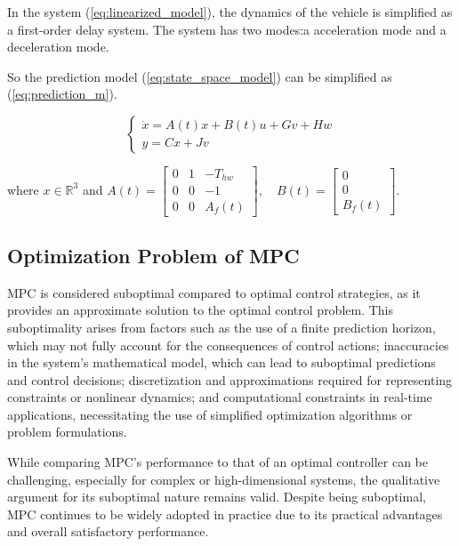 \documentclass{article}
\numberwithin{equation}{section}
\begin{document}
In the system (\ref{eq:linearized_model}), the dynamics of the vehicle is
simplified as a first-order delay system. The system has two modes:a
acceleration mode and a deceleration mode.

So the prediction model (\ref{eq:state_space_model}) can be simplified as
(\ref{eq:prediction_m}).

\begin{equation}
    \left\{\begin{array}{l}\label{eq:prediction_m}
        \dot{x}=A(t)x+B(t)u+Gv+Hw \\
        y=Cx+Jv
    \end{array}\right.
\end{equation}

\noindent where $x \in \mathbb{R}^3$ and $A(t)=\left[\begin{array}{ccc}
            0 & 1 & -T_{h w} \\
            0 & 0 & -1       \\
            0 & 0 & A_{f}(t)
        \end{array}\right], \quad B(t)=\left[\begin{array}{c}
            0 \\
            0 \\
            B_{f}(t)
        \end{array}\right]$.
\subsection{Optimization Problem of MPC}

MPC is considered suboptimal compared to optimal control strategies, as it
provides an approximate solution to the optimal control problem. This
suboptimality arises from factors such as the use of a finite prediction
horizon, which may not fully account for the consequences of control actions;
inaccuracies in the system's mathematical model, which can lead to suboptimal
predictions and control decisions; discretization and approximations required
for representing constraints or nonlinear dynamics; and computational
constraints in real-time applications, necessitating the use of simplified
optimization algorithms or problem formulations.

While comparing MPC's performance to that of an optimal controller can be
challenging, especially for complex or high-dimensional systems, the
qualitative argument for its suboptimal nature remains valid. Despite being
suboptimal, MPC continues to be widely adopted in practice due to its practical
advantages and overall satisfactory performance.
\end{document}

